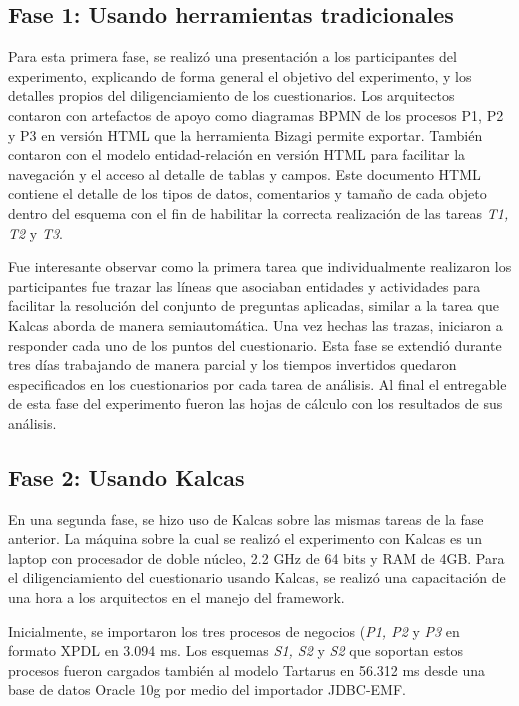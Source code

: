 \subsection{Fase 1: Usando herramientas tradicionales} \label{subsec:exp-fase1}

Para esta primera fase, se realiz\'o una presentaci\'on a los participantes del experimento, explicando de forma general el objetivo del experimento, y los detalles propios del diligenciamiento de los cuestionarios. Los arquitectos contaron con artefactos de apoyo como diagramas BPMN de los procesos P1, P2 y P3 en versi\'on HTML que la herramienta Bizagi permite exportar. Tambi\'en contaron con el modelo entidad-relaci\'on en versi\'on HTML para facilitar la navegaci\'on y el acceso al detalle de tablas y campos. Este documento HTML contiene el detalle de los tipos de datos, comentarios y tama\~no de cada objeto dentro del esquema con el fin de habilitar la correcta realizaci\'on de las tareas \textit{T1, T2} y \textit{T3}.

Fue interesante observar como la primera tarea que individualmente realizaron los participantes fue trazar las l\'ineas que asociaban entidades y actividades para facilitar la resoluci\'on del conjunto de preguntas aplicadas, similar a la tarea que Kalcas aborda de manera semiautom\'atica. Una vez hechas las trazas, iniciaron a responder cada uno de los puntos del cuestionario. Esta fase se extendi\'o durante tres d\'ias trabajando de manera parcial y los tiempos invertidos quedaron especificados en los cuestionarios por cada tarea de an\'alisis. Al final el entregable de esta fase del experimento fueron las hojas de c\'alculo con los resultados de sus an\'alisis.

\subsection{Fase 2: Usando Kalcas} \label{subsec:exp-fase2}

En una segunda fase, se hizo uso de Kalcas sobre las mismas tareas de la fase anterior. La m\'aquina sobre la cual se realiz\'o el experimento con Kalcas es un laptop con procesador de doble n\'ucleo, 2.2 GHz de 64 bits y RAM de 4GB. Para el diligenciamiento del cuestionario usando Kalcas, se realiz\'o una capacitaci\'on de una hora a los arquitectos en el manejo del framework. 

Inicialmente, se importaron los tres procesos de negocios (\textit{P1, P2} y \textit{P3} en formato XPDL en 3.094 ms. Los esquemas \textit{S1, S2} y \textit{S2} que soportan estos procesos fueron cargados tambi\'en al modelo Tartarus en 56.312 ms desde una base de datos Oracle 10g por medio del importador JDBC-EMF.

